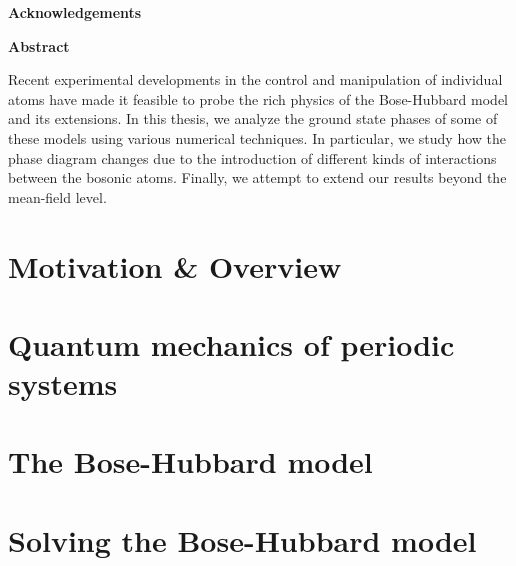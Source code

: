 \documentclass[titlepage]{report}
\begin{document}
\newpage
\begin{center}
\textbf{\Large Acknowledgements}
\end{center}


\newpage
\begin{center}
  \textbf{\Large Abstract}
\end{center}

Recent experimental developments in the control and manipulation of individual atoms have made it feasible to probe the rich physics of the Bose-Hubbard model and its extensions. In this thesis, we analyze the ground state phases of some of these models using various numerical techniques. In particular, we study how the phase diagram changes due to the introduction of different kinds of interactions between the bosonic atoms. Finally, we attempt to extend our results beyond the mean-field level.

\restoregeometry
{}
\listoffigures

\tableofcontents

\chapter*{Motivation \& Overview}


\setlength{\headheight}{14.5pt}
\pagestyle{fancy}
\fancyhf{}
\renewcommand{\headrulewidth}{1pt}
\renewcommand{\footrulewidth}{0pt}
\renewcommand{\chaptermark}[1]{\markboth{#1}{#1}}
\fancyhead[R]{\thepage}
\fancyhead[L]{\chaptername\ \thechapter\ --\ \leftmark}
\thispagestyle{empty}

\chapter{Quantum mechanics of periodic systems}\label{ch1}


\chapter{The Bose-Hubbard model}\label{ch2}


\chapter{Solving the Bose-Hubbard model}\label{ch3}

\end{document}
